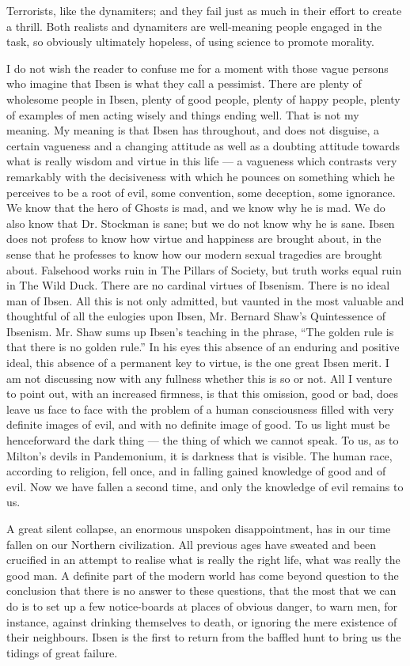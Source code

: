 Terrorists, like the dynamiters; and they fail just as much in their effort to create a thrill. Both realists and dynamiters are well-meaning people engaged in the task, so obviously ultimately hopeless, of using science to promote morality.

I do not wish the reader to confuse me for a moment with those vague persons who imagine that Ibsen is what they call a pessimist. There are plenty of wholesome people in Ibsen, plenty of good people, plenty of happy people, plenty of examples of men acting wisely and things ending well. That is not my meaning. My meaning is that Ibsen has throughout, and does not disguise, a certain vagueness and a changing attitude as well as a doubting attitude towards what is really wisdom and virtue in this life — a vagueness which contrasts very remarkably with the decisiveness with which he pounces on something which he perceives to be a root of evil, some convention, some deception, some ignorance. We know that the hero of Ghosts is mad, and we know why he is mad. We do also know that Dr. Stockman is sane; but we do not know why he is sane. Ibsen does not profess to know how virtue and happiness are brought about, in the sense that he professes to know how our modern sexual tragedies are brought about. Falsehood works ruin in The Pillars of Society, but truth works equal ruin in The Wild Duck. There are no cardinal virtues of Ibsenism. There is no ideal man of Ibsen. All this is not only admitted, but vaunted in the most valuable and thoughtful of all the eulogies upon Ibsen, Mr. Bernard Shaw’s Quintessence of Ibsenism. Mr. Shaw sums up Ibsen’s teaching in the phrase, “The golden rule is that there is no golden rule.” In his eyes this absence of an enduring and positive ideal, this absence of a permanent key to virtue, is the one great Ibsen merit. I am not discussing now with any fullness whether this is so or not. All I venture to point out, with an increased firmness, is that this omission, good or bad, does leave us face to face with the problem of a human consciousness filled with very definite images of evil, and with no definite image of good. To us light must be henceforward the dark thing — the thing of which we cannot speak. To us, as to Milton’s devils in Pandemonium, it is darkness that is visible. The human race, according to religion, fell once, and in falling gained knowledge of good and of evil. Now we have fallen a second time, and only the knowledge of evil remains to us.

A great silent collapse, an enormous unspoken disappointment, has in our time fallen on our Northern civilization. All previous ages have sweated and been crucified in an attempt to realise what is really the right life, what was really the good man. A definite part of the modern world has come beyond question to the conclusion that there is no answer to these questions, that the most that we can do is to set up a few notice-boards at places of obvious danger, to warn men, for instance, against drinking themselves to death, or ignoring the mere existence of their neighbours. Ibsen is the first to return from the baffled hunt to bring us the tidings of great failure.

